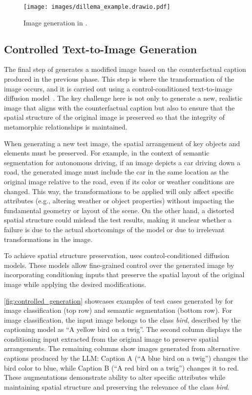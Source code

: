 \begin{figure*}
\centering
    \centering
    \texttt{[image: images/dillema\_example.drawio.pdf]}
\caption{Image generation in \approach.}
\label{fig:controlled_generation}
\end{figure*}
\subsection{Controlled Text-to-Image Generation}

The final step of \approach generates a modified image based on the counterfactual caption produced in the previous phase. This step is where the transformation of the image occurs, and it is carried out using a control-conditioned text-to-image diffusion model~\cite{DBLP:conf/iccv/ZhangRA23}.  The key challenge here is not only to generate a new, realistic image that aligns with the counterfactual caption but also to ensure that the spatial structure of the original image is preserved so that the integrity of metamorphic relationships is maintained.

When generating a new test image, the spatial arrangement of key objects and elements must be preserved. For example, in the context of semantic segmentation for autonomous driving, if an image depicts a car driving down a road, the generated image must include the car in the same location as the original image relative to the road, even if its color or weather conditions are changed. This way, the transformations to be applied will only affect specific attributes (e.g., altering weather or object properties) without impacting the fundamental geometry or layout of the scene. On the other hand, a distorted spatial structure could mislead the test results, making it unclear whether a failure is due to the actual shortcomings of the model or due to irrelevant transformations in the image.

To achieve spatial structure preservation, \approach uses control-conditioned diffusion models. These models allow fine-grained control over the generated image by incorporating conditioning inputs that preserve the spatial layout of the original image while applying the desired modifications.

\autoref{fig:controlled_generation} showcases examples of test cases generated by \approach for image classification (top row) and semantic segmentation (bottom row).
For image classification, the input image belongs to the class \textit{bird}, described by the captioning model as ``A yellow bird on a twig''. The second column displays the conditioning input extracted from the original image to preserve spatial arrangements. The remaining columns show images generated from alternative captions produced by the LLM: Caption A (``A blue bird on a twig'') changes the bird color to blue, while Caption B (``A red bird on a twig'') changes it to red. 
These augmentations demonstrate \approach ability to alter specific attributes while maintaining spatial structure and preserving the relevance of the class \textit{bird}. 

